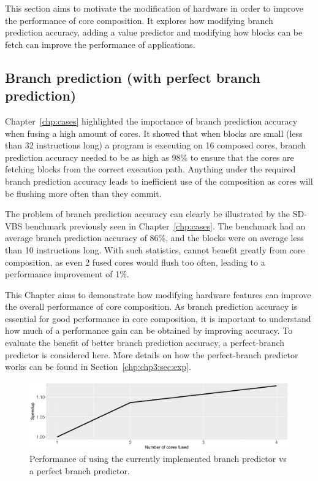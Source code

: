 This section aims to motivate the modification of hardware in order to improve the performance of core composition.
It explores how modifying branch prediction accuracy, adding a value predictor and modifying how blocks can be fetch can improve the performance of applications.

\subsection{Branch prediction (with perfect branch prediction)}

Chapter~\ref{chp:cases} highlighted the importance of branch prediction accuracy when fusing a high amount of cores.
It showed that when blocks are small (less than 32 instructions long) a program is executing on 16 composed cores, branch prediction accuracy needed to be as high as 98\% to ensure that the cores are fetching blocks from the correct execution path.
Anything under the required branch prediction accuracy leads to inefficient use of the composition as cores will be flushing more often than they commit.

The problem of branch prediction accuracy can clearly be illustrated by the SD-VBS benchmark  previously seen in Chapter~\ref{chp:cases}.
The benchmark had an average branch prediction accuracy of 86\%, and the blocks were on average less than 10 instructions long.
With such statistics,  cannot benefit greatly from core composition, as even 2 fused cores would flush too often, leading to a performance improvement of 1\%.

This Chapter aims to demonstrate how modifying hardware features can improve the overall performance of core composition.
As branch prediction accuracy is essential for good performance in core composition, it is important to understand how much of a performance gain can be obtained by improving accuracy.
To evaluate the benefit of better branch prediction accuracy, a perfect-branch predictor is considered here.
More details on how the perfect-branch predictor works can be found in Section~\ref{chp:chp3:sec:exp}.

\begin{figure}[t]
    \centering
    \includegraphics[width=1\textwidth]{chapter3/graphics/mser_branch_motiv.pdf}

    \caption{Performance of  using the currently implemented branch predictor vs a perfect branch predictor.}
    \label{fig:mser_motiv}
	\vspace{1em}
\end{figure}

